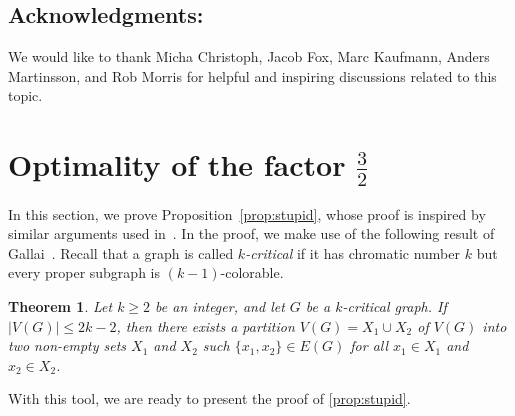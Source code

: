 \documentclass[11pt,reqno,oneside]{amsart}
\newtheorem{theorem}{Theorem}[section]
\theoremstyle{definition}
\newcommand\1{\mathbf{1}}
\let\leq\leqslant
\let\geq\geqslant
\begin{document}
\subsection*{Acknowledgments:} We would like to thank Micha Christoph, Jacob Fox, Marc Kaufmann, Anders Martinsson, and Rob Morris for helpful and inspiring discussions related to this topic. 



\appendix
{}

\section{Optimality of the factor \texorpdfstring{$\frac 32$}{3/2}}\label{appendix:optimality}
In this section, we prove Proposition~\ref{prop:stupid}, whose proof is inspired by similar arguments used in~\cite{ji2025oddcliqueminorsgraphs}. In the proof, we make use of the following result of Gallai~\cite{MR188100}. Recall that a graph is called \emph{$k$-critical} if it has chromatic number $k$ but every proper subgraph is $(k-1)$-colorable.
\begin{theorem}\label{thm:gallai}
    Let $k\geq 2$ be an integer, and let $G$ be a $k$-critical graph. If $|V(G)|\leq 2k-2$, then there exists a partition $V(G)=X_1\cup X_2$ of $V(G)$ into two non-empty sets $X_1$ and $X_2$ such $\{x_1,x_2\}\in E(G)$ for all $x_1\in X_1$ and $x_2\in X_2$.
\end{theorem}

\noindent With this tool, we are ready to present the proof of \cref{prop:stupid}.
\end{document}
